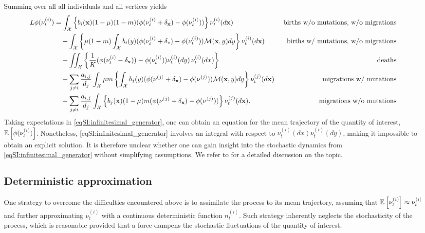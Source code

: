     Summing over all all individuals and all vertices yields
    \small
    \begin{align} \label{eqSI:infinitesimal_generator}
        L\phi(\nu^{(i)}_t) &= \int_\mathcal{X} \left\{ b_i({\textbf x}) (1 - \mu ) (1 - m)( \phi(\nu^{(i)}_t + \delta_{{\textbf x}}) - \phi(\nu^{(i)}_t))\right\} \nu^{(i)}_t(d{\textbf x}) &\text{ births w/o mutations, w/o migrations} \nonumber\\
        &\quad + \int_\mathcal{X}  \left\{\mu (1-m) \int_\mathcal{X} b_i(y) (\phi(\nu^{(i)}_t + \delta_z) - \phi(\nu^{(i)}_t))\mathcal{M}({\textbf x},y) dy \right\} \nu^{(i)}_t(d{\textbf x})  &\text{ births w/ mutations, w/o migrations} \nonumber\\
        &\quad + \iint_\mathcal{X} \left\{ \frac{1}{K}(\phi(\nu^{(i)}_t - \delta_{{\textbf x}})) - \phi(\nu^{(i)}_t))\nu^{(i)}_t(d y) \, \nu^{(i)}_t(dx)  \right\} &\text{ deaths} \nonumber\\
        &\quad + \sum_{j \neq i } \frac{a_{i,j}}{d_j} \int_\mathcal{X}  \mu m \left\{ \int_\mathcal{X} b_j(y) (\phi(\nu^{(j)} +  \delta_{\textbf x}) - \phi(\nu^{(j)}))\mathcal{M}({\textbf x}, y)dy \right\} \nu^{(j)}_t(d{\textbf x})  &\text{ migrations w/ mutations} \nonumber\\
        &\quad + \sum_{j\neq i}\frac{a_{i,j}}{d_j} \int_\mathcal{X} \left\{ b_j({\textbf x}) (1 - \mu ) m ( \phi(\nu^{(j)} + \delta_{{\textbf x}}) - \phi(\nu^{(j)})) \right\} \nu^{(j)}_t(d{\textbf x}). &\text{ migrations w/o mutations} 
    \end{align}
    \normalsize
    Taking expectations in \cref{eqSI:infinitesimal_generator}, one can obtain an equation for the mean trajectory of the quantity of interest, $ {\mathbb{E}} \left[ \phi(\nu^{(i)}_t) \right]$. Nonetheless, \cref{eqSI:infinitesimal_generator} involves an integral with respect to $\nu^{(i)}_t(dx) \nu^{(i)}_t(dy)$, making it impossible to obtain an explicit solution. It is therefore unclear whether one can gain insight into the stochastic dynamics from \cref{eqSI:infinitesimal_generator} without simplifying assumptions. We refer to \cite{Champagnat2006} for a detailed discussion on the topic.
    
    \subsection{Deterministic approximation} 
    One strategy to overcome the difficulties encountered above is to assimilate the process to its mean trajectory, assuming that ${\mathbb{E}} \left[ \nu^{(i)}_t \right] \approx \nu^{(i)}_t$ and further approximating $\nu^{(i)}_t$ with a continuous deterministic function $n_t^{(i)}$. Such strategy inherently neglects the stochasticity of the process, which is reasonable provided that a force dampens the stochastic fluctuations of the quantity of interest.
    
